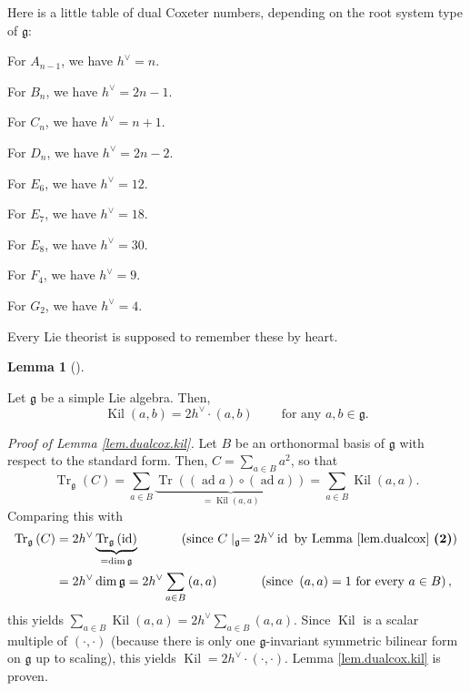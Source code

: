 \documentclass
[numbers=enddot,12pt,final,onecolumn,german,notitlepage]{scrartcl}%
\theoremstyle{definition}
\newtheorem{lem}[theo]{Lemma}
\newenvironment{lemma}[1][]
{\begin{lem}[#1]\begin{leftbar}}
{\end{leftbar}\end{lem}}
\begin{document}
Here is a little table of dual Coxeter numbers, depending on the root system
type of $\mathfrak{g}$:

For $A_{n-1}$, we have $h^{\vee}=n$.

For $B_{n}$, we have $h^{\vee}=2n-1$.

For $C_{n}$, we have $h^{\vee}=n+1$.

For $D_{n}$, we have $h^{\vee}=2n-2$.

For $E_{6}$, we have $h^{\vee}=12$.

For $E_{7}$, we have $h^{\vee}=18$.

For $E_{8}$, we have $h^{\vee}=30$.

For $F_{4}$, we have $h^{\vee}=9$.

For $G_{2}$, we have $h^{\vee}=4$.

Every Lie theorist is supposed to remember these by heart.

\begin{lemma}
\label{lem.dualcox.kil}Let $\mathfrak{g}$ be a simple Lie algebra. Then,%
\[
\operatorname*{Kil}\left(  a,b\right)  =2h^{\vee}\cdot\left(  a,b\right)
\ \ \ \ \ \ \ \ \ \ \text{for any }a,b\in\mathfrak{g}.
\]

\end{lemma}

\textit{Proof of Lemma \ref{lem.dualcox.kil}.} Let $B$ be an orthonormal basis
of $\mathfrak{g}$ with respect to the standard form. Then, $C=\sum
\limits_{a\in B}a^{2}$, so that
\[
\operatorname*{Tr}\nolimits_{\mathfrak{g}}\left(  C\right)  =\sum\limits_{a\in
B}\underbrace{\operatorname*{Tr}\left(  \left(  \operatorname*{ad}a\right)
\circ\left(  \operatorname*{ad}a\right)  \right)  }_{=\operatorname*{Kil}%
\left(  a,a\right)  }=\sum\limits_{a\in B}\operatorname*{Kil}\left(
a,a\right)  .
\]
Comparing this with%
\begin{align*}
\operatorname*{Tr}\nolimits_{\mathfrak{g}}\left(  C\right)   &  =2h^{\vee
}\underbrace{\operatorname*{Tr}\nolimits_{\mathfrak{g}}\left(
\operatorname*{id}\right)  }_{=\dim\mathfrak{g}}\ \ \ \ \ \ \ \ \ \ \left(
\text{since }C\mid_{\mathfrak{g}}=2h^{\vee}\operatorname*{id}\text{ by Lemma
\ref{lem.dualcox} \textbf{(2)}}\right) \\
&  =2h^{\vee}\dim\mathfrak{g}=2h^{\vee}\sum\limits_{a\in B}\left(  a,a\right)
\ \ \ \ \ \ \ \ \ \ \left(  \text{since }\left(  a,a\right)  =1\text{ for
every }a\in B\right)  ,
\end{align*}
this yields $\sum\limits_{a\in B}\operatorname*{Kil}\left(  a,a\right)
=2h^{\vee}\sum\limits_{a\in B}\left(  a,a\right)  $. Since
$\operatorname*{Kil}$ is a scalar multiple of $\left(  \cdot,\cdot\right)  $
(because there is only one $\mathfrak{g}$-invariant symmetric bilinear form on
$\mathfrak{g}$ up to scaling), this yields $\operatorname*{Kil}=2h^{\vee}%
\cdot\left(  \cdot,\cdot\right)  $. Lemma \ref{lem.dualcox.kil} is proven.
\end{document}
